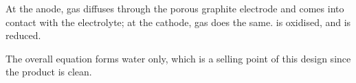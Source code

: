 			At the anode,  gas diffuses through the porous graphite electrode and comes into contact with the  electrolyte; at
			the cathode,  gas does the same.  is oxidised, and  is reduced.

			The overall equation forms water only, which is a selling point of this design since the product is clean.






































